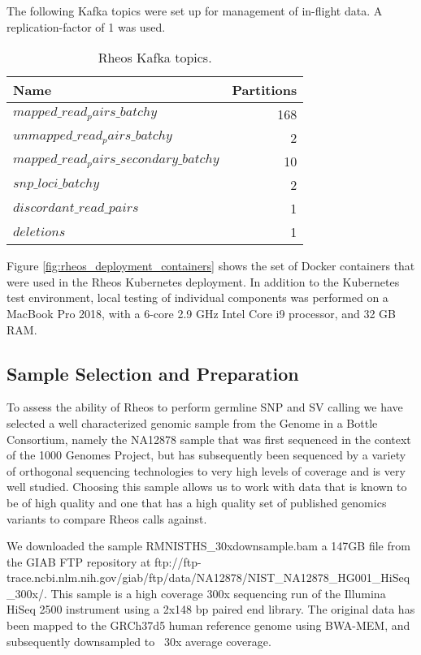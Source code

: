 The following Kafka topics were set up for management of in-flight data. A replication-factor of 1 was used.

\begin{table}[!ht]
    \centering
    \caption{Rheos Kafka topics.}
    \label{tab:rheos_kafka_topics}
    {\begin{tabular}{l | r }
    \toprule
    Name & Partitions \\
    \midrule
    $mapped\_read_pairs\_batchy$ & 168\\
    $unmapped\_read_pairs\_batchy$ & 2\\
    $mapped\_read_pairs\_secondary\_batchy$ & 10\\
    $snp\_loci\_batchy$ & 2\\
    $discordant\_read\_pairs$ & 1\\
    $deletions$ & 1\\
    \bottomrule
    \end{tabular}}
\end{table}

Figure \ref{fig:rheos_deployment_containers} shows the set of Docker containers that were used in the Rheos Kubernetes deployment. In addition to the Kubernetes test environment, local testing of individual components was performed on a MacBook Pro 2018, with a 6-core 2.9 GHz Intel Core i9 processor, and 32 GB RAM. 

\subsection{Sample Selection and Preparation}

To assess the ability of Rheos to perform germline SNP and SV calling we have selected a well characterized genomic sample from the Genome in a Bottle Consortium\autocite{zook2018reproducible}, namely the NA12878 sample that was first sequenced in the context of the 1000 Genomes Project, but has subsequently been sequenced by a variety of orthogonal sequencing technologies to very high levels of coverage and is very well studied. Choosing this sample allows us to work with data that is known to be of high quality and one that has a high quality set of published genomics variants to compare Rheos calls against.

We downloaded the sample RMNISTHS\_30xdownsample.bam a 147GB file from the GIAB FTP repository at ftp://ftp-trace.ncbi.nlm.nih.gov/giab/ftp/data/NA12878/NIST\_NA12878\_HG001\_HiSeq\_300x/. This sample is a high coverage 300x sequencing run of the Illumina HiSeq 2500 instrument using a 2x148 bp paired end library. The original data has been mapped to the GRCh37d5 human reference genome using BWA-MEM, and subsequently downsampled to ~30x average coverage. 

